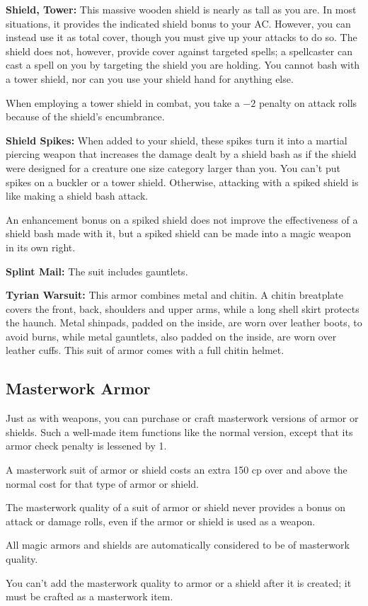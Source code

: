 \textbf{Shield, Tower:} This massive wooden shield is nearly as tall as you are. In most situations, it provides the indicated shield bonus to your AC. However, you can instead use it as total cover, though you must give up your attacks to do so. The shield does not, however, provide cover against targeted spells; a spellcaster can cast a spell on you by targeting the shield you are holding. You cannot bash with a tower shield, nor can you use your shield hand for anything else.

When employing a tower shield in combat, you take a $-2$ penalty on attack rolls because of the shield's encumbrance.

\textbf{Shield Spikes:} When added to your shield, these spikes turn it into a martial piercing weapon that increases the damage dealt by a shield bash as if the shield were designed for a creature one size category larger than you. You can't put spikes on a buckler or a tower shield. Otherwise, attacking with a spiked shield is like making a shield bash attack.

An enhancement bonus on a spiked shield does not improve the effectiveness of a shield bash made with it, but a spiked shield can be made into a magic weapon in its own right.

\textbf{Splint Mail:} The suit includes gauntlets.

\textbf{Tyrian Warsuit:} This armor combines metal and chitin. A chitin breatplate covers the front, back, shoulders and upper arms, while a long shell skirt protects the haunch. Metal shinpads, padded on the inside, are worn over leather boots, to avoid burns, while metal gauntlets, also padded on the inside, are worn over leather cuffs. This suit of armor comes with a full chitin helmet.

\subsection{Masterwork Armor}
Just as with weapons, you can purchase or craft masterwork versions of armor or shields. Such a well-made item functions like the normal version, except that its armor check penalty is lessened by 1.

A masterwork suit of armor or shield costs an extra 150 cp over and above the normal cost for that type of armor or shield.

The masterwork quality of a suit of armor or shield never provides a bonus on attack or damage rolls, even if the armor or shield is used as a weapon.

All magic armors and shields are automatically considered to be of masterwork quality.

You can't add the masterwork quality to armor or a shield after it is created; it must be crafted as a masterwork item.
